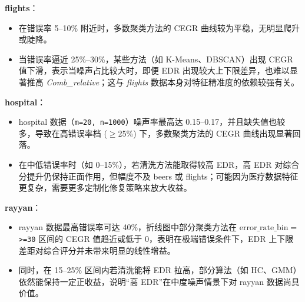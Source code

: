 \documentclass[10pt]{article} %
\numberwithin{equation}{section}
\begin{document}
\begin{enumerate}[label=(\alph*)]
\textbf{flights}：
    \begin{itemize}
        \item 在错误率 5--10\% 附近时，多数聚类方法的 CEGR 曲线较为平稳，无明显爬升或陡降。
        \item 当错误率逼近 25\%--30\%，某些方法（如 K-Means、DBSCAN）出现 CEGR 值下滑，表示当噪声占比较大时，即便 EDR 出现较大上下限差异，也难以显著推高 \textit{Comb\_relative}；这与 \textit{flights} 数据本身对特征精准度的依赖较强有关。
    \end{itemize}

\textbf{hospital}：
    \begin{itemize}
        \item hospital 数据（\texttt{m=20, n=1000}）噪声率最高达 0.15--0.17，并且缺失值也较多，导致在高错误率档 (\(\geq\)25\%) 下，多数聚类方法的 CEGR 曲线出现显著回落。
        \item 在中低错误率时（如 0--15\%），若清洗方法能取得较高 EDR，高 EDR 对综合分提升仍保持正面作用，但幅度不及 beers 或 flights；可能因为医疗数据特征更复杂，需要更多定制化修复策略来放大收益。
    \end{itemize}

\textbf{rayyan}：
    \begin{itemize}
        \item rayyan 数据最高错误率可达 40\%，折线图中部分聚类方法在 \(\mathrm{error\_rate\_bin} = \) \texttt{>=30} 区间的 CEGR 值趋近或低于 0，表明在极端错误条件下，EDR 上下限差距对综合评分并未带来明显的线性增益。
        \item 同时，在 15--25\% 区间内若清洗能将 EDR 拉高，部分算法（如 HC、GMM）依然能保持一定正收益，说明“高 EDR”在中度噪声情景下对 rayyan 数据尚具价值。
    \end{itemize}


\end{enumerate}
\end{document}
